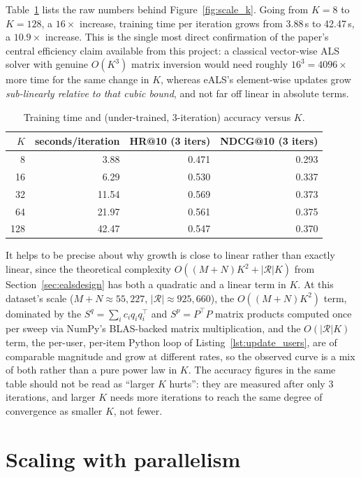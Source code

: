 Table~\ref{tab:scale_k} lists the raw numbers behind Figure~\ref{fig:scale_k}.
Going from $K=8$ to $K=128$, a $16\times$ increase, training time per
iteration grows from 3.88\,s to 42.47\,s, a $10.9\times$ increase. This is
the single most direct confirmation of the paper's central efficiency
claim available from this project: a classical vector-wise ALS solver with
genuine $O(K^3)$ matrix inversion would need roughly $16^3 = 4096\times$
more time for the same change in $K$, whereas eALS's element-wise updates
grow \emph{sub-linearly relative to that cubic bound}, and not far off
linear in absolute terms.

\begin{table}[H]
\centering
\begin{tabular}{rrrr}
\toprule
$K$ & seconds/iteration & HR@10 (3 iters) & NDCG@10 (3 iters) \\
\midrule
8   & 3.88  & 0.471 & 0.293 \\
16  & 6.29  & 0.530 & 0.337 \\
32  & 11.54 & 0.569 & 0.373 \\
64  & 21.97 & 0.561 & 0.375 \\
128 & 42.47 & 0.547 & 0.370 \\
\bottomrule
\end{tabular}
\caption{Training time and (under-trained, 3-iteration) accuracy versus
$K$.}
\label{tab:scale_k}
\end{table}

It helps to be precise about why growth is close to linear rather than
exactly linear, since the theoretical complexity
$O((M+N)K^2+|\mathcal{R}|K)$ from Section~\ref{sec:ealsdesign} has both a
quadratic and a linear term in $K$. At this dataset's scale
($M+N\approx55{,}227$, $|\mathcal{R}|\approx925{,}660$), the $O((M+N)K^2)$
term, dominated by the $S^q=\sum_i c_i q_i q_i^\top$ and $S^p=P^\top P$
matrix products computed once per sweep via NumPy's BLAS-backed matrix
multiplication, and the $O(|\mathcal{R}|K)$ term, the per-user,
per-item Python loop of Listing~\ref{lst:update_users}, are of comparable
magnitude and grow at different rates, so the observed curve is a mix of
both rather than a pure power law in $K$. The accuracy figures in the same
table should not be read as ``larger $K$ hurts'': they are measured after
only 3 iterations, and larger $K$ needs more iterations to reach the same
degree of convergence as smaller $K$, not fewer.

\section{Scaling with parallelism}
\label{sec:scale_par}

